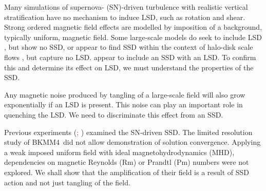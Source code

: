 \documentclass[preprint2]{aastex63}
\newcommand\BKM{{\sf BKMM4}}
\newcommand{\fg}[1]{\textcolor{midgreen}{#1}}
\newcommand{\mjk}[1]{\textcolor{red}{#1}}
\begin{document}
 Many simulations of supernova- (SN)-driven turbulence with realistic vertical
 stratification \citep[e.g.,][]{deAvillez:2005,PO07,Hill:2012a,HI14} have no
 mechanism to induce LSD, such as rotation and shear.
 Strong ordered magnetic field effects are modelled by
 imposition of a background, typically uniform, magnetic field.
 \fg{Some large-scale models do seek to include LSD 
 \citep[e.g.,][]{Korpi:1999b,Gressel:2008,HWK09,WA09,Pakmor17,
 GE20}, but show no SSD, or appear to find SSD 
 within the context of halo-disk
 scale flows \citep[e.g.,][]{RT16,SBADMN19},  but capture no LSD.}
\citet[][with additional analysis by \citealt{EGSFB16}]{Gent:2013b}
 appear to include an \fg{SSD with} \fg{an} \fg{LSD}.
 To confirm this and determine its effect on LSD, we must understand the
 properties of the SSD.
     
 Any magnetic noise produced by tangling \fg{of a large-scale field}
 will also grow exponentially \fg{if an LSD is} present.
 This noise \fg{can play} an important role in quenching the LSD.
 We need to discriminate this effect from an SSD.   

 Previous experiments (\mjk{\citealp[e.g.,][hereafter \BKM]{BKMM04};
 \citealp{BalKim05,MacLow:2005}})
 examined the SN-driven SSD.
 \fg{The limited  resolution} \fg{study} \fg{of \BKM\ did not allow
 demonstration of \fg{solution} convergence.
 Applying a weak imposed uniform field with ideal magnetohydrodynamics (MHD),
 dependencies on magnetic Reynolds (Rm) or Prandtl (Pm) numbers were not
 explored.}
 We shall show that the amplification of their field is a result
 of SSD action and not just tangling of the field.
\end{document}
